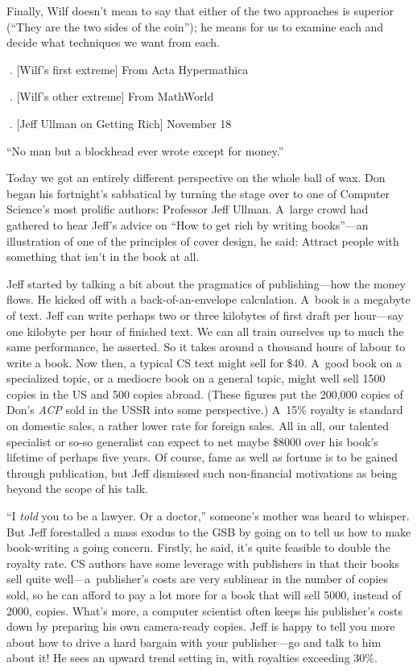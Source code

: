 Finally, Wilf doesn't mean to say that either of the two approaches is
superior (``They are the two sides of the coin''); he means for us to
examine each and decide what techniques we want from each.

\vfill\eject
. [Wilf's first extreme] From Acta Hypermathica

\vfill\eject
. [Wilf's other extreme] From MathWorld

\null\vfill\eject
\null\vfill\eject
\null\vfill\eject
\null\vfill\eject
. [Jeff Ullman on Getting Rich]	\pmr November 18

{\narrower\smallskip\noindent
   ``No man but a blockhead ever wrote except for money.''
\smallskip}

\medskip
Today we got an entirely different perspective on the whole ball of
wax. Don began his fortnight's sabbatical by turning the stage over to
one of Computer Science's most prolific authors: Professor Jeff
Ullman. A~large crowd had gathered to hear Jeff's advice on ``How to
get rich by writing books''---an illustration of one of the principles
of cover design, he said: Attract people with something that isn't in
the book at all.

Jeff started by talking a bit about the pragmatics of publishing---how
the money flows. He kicked off with a back-of-an-envelope calculation.
A~book is a megabyte of text. Jeff can write perhaps two or three
kilobytes of first draft per hour---say one kilobyte per hour of
finished text. We can all train ourselves up to much the same
performance, he asserted. So it takes around a thousand hours of
labour to write a book. Now then, a typical CS text might sell for
\$40. A~good book on a specialized topic, or a mediocre book on a
general topic, might well sell 1500 copies in the US and 500 copies
abroad. (These figures put the 200,000 copies of Don's {\sl ACP\/} sold
in the USSR into some perspective.) A~15\% royalty is standard on
domestic sales, a rather lower rate for foreign sales.  All in all,
our talented specialist or so-so generalist can expect to net maybe
\$8000 over his book's lifetime of perhaps five years. Of course, fame
as well as fortune is to be gained through publication, but Jeff
dismissed such non-financial motivations as being beyond the scope of
his talk.

``I {\it told\/} you to be a lawyer. Or a doctor,'' someone's mother was
heard to whisper. But Jeff forestalled a mass exodus to the GSB by
going on to tell us how to make book-writing a going concern. Firstly,
he said, it's quite feasible to double the royalty rate. CS authors
have some leverage with publishers in that their books sell quite 
well---a~publisher's
costs are very sublinear in the number of copies sold,
so he can afford to pay a lot more for a book that will sell 5000,
instead of 2000, copies. What's more, a computer scientist often keeps
his publisher's costs down by preparing his own camera-ready copies.
Jeff is happy to tell you more about how to drive a hard bargain with
your publisher---go and talk to him about it! He sees an upward trend
setting in, with royalties exceeding 30\%.


